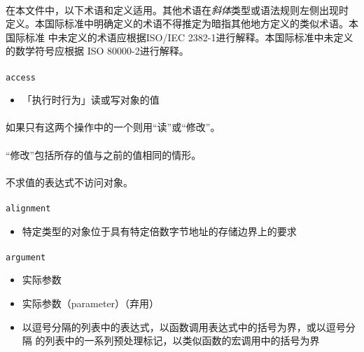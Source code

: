 
\paragraph{}
在本文件中，以下术语和定义适用。其他术语在\textit{斜体}类型或语法规则左侧出现时
定义。本国际标准中明确定义的术语不得推定为暗指其他地方定义的类似术语。本国际标准
中未定义的术语应根据ISO/IEC 2382-1进行解释。本国际标准中未定义的数学符号应根据
ISO 80000-2进行解释。


\paragraph{}
\texttt{access}
\begin{itemize}
  \item[]{「执行时行为」读或写对象的值}
\end{itemize}

\paragraph{}
\notes 如果只有这两个操作中的一个则用``读''或``修改''。

\paragraph{}
\notes ``修改''包括所存的值与之前的值相同的情形。

\paragraph{}
\notes 不求值的表达式不访问对象。

\paragraph{}
\texttt{alignment}
\begin{itemize}
  \item[]{特定类型的对象位于具有特定倍数字节地址的存储边界上的要求}
\end{itemize}

\paragraph{}
\texttt{argument}
\begin{itemize}
  \item[]{实际参数}
  \item[]{实际参数（parameter）（弃用）}
  \item[]{以逗号分隔的列表中的表达式，以函数调用表达式中的括号为界，或以逗号分隔
    的列表中的一系列预处理标记，以类似函数的宏调用中的括号为界}
\end{itemize}

